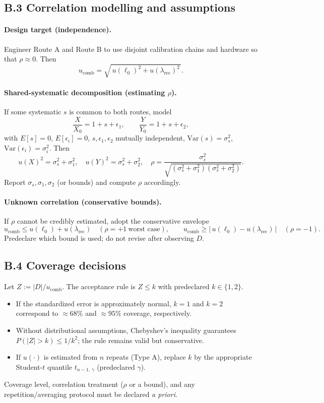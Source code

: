 \documentclass[11pt]{article}
\begin{document}
\subsection*{B.3 Correlation modelling and assumptions}
\paragraph{Design target (independence).}
Engineer Route A and Route B to use disjoint calibration chains and hardware so that \(\rho\approx 0\). Then
\[
u_{\mathrm{comb}}=\sqrt{\,u(\ell_0)^2 + u(\lambda_{\mathrm{rec}})^2\,}.
\]

\paragraph{Shared-systematic decomposition (estimating \(\rho\)).}
If some systematic \(s\) is common to both routes, model
\[
\frac{X}{X_0}=1+s+\epsilon_1,\qquad
\frac{Y}{Y_0}=1+s+\epsilon_2,
\]
with \(E[s]=0\), \(E[\epsilon_i]=0\), \(s,\epsilon_1,\epsilon_2\) mutually independent, \(\mathrm{Var}(s)=\sigma_s^2\), \(\mathrm{Var}(\epsilon_i)=\sigma_i^2\).
Then
\[
u(X)^2=\sigma_s^2+\sigma_1^2,\quad
u(Y)^2=\sigma_s^2+\sigma_2^2,\quad
\rho=\frac{\sigma_s^2}{\sqrt{(\sigma_s^2+\sigma_1^2)(\sigma_s^2+\sigma_2^2)}}.
\]
Report \(\sigma_s,\sigma_1,\sigma_2\) (or bounds) and compute \(\rho\) accordingly.

\paragraph{Unknown correlation (conservative bounds).}
If \(\rho\) cannot be credibly estimated, adopt the conservative envelope
\[
u_{\mathrm{comb}} \le u(\ell_0)+u(\lambda_{\mathrm{rec}})\quad(\rho=+1\ \text{worst case}),\qquad
u_{\mathrm{comb}} \ge \big|\,u(\ell_0)-u(\lambda_{\mathrm{rec}})\,\big|\quad(\rho=-1).
\]
Predeclare which bound is used; do not revise after observing \(D\).

\subsection*{B.4 Coverage decisions}
Let \(Z:=|D|/u_{\mathrm{comb}}\). The acceptance rule is \(Z\le k\) with predeclared \(k\in\{1,2\}\).
\begin{itemize}
  \item If the standardized error is approximately normal, \(k=1\) and \(k=2\) correspond to \(\approx68\%\) and \(\approx95\%\) coverage, respectively.
  \item Without distributional assumptions, Chebyshev’s inequality guarantees \(P(|Z|>k)\le 1/k^2\); the rule remains valid but conservative.
  \item If \(u(\cdot)\) is estimated from \(n\) repeats (Type A), replace \(k\) by the appropriate Student-\(t\) quantile \(t_{n-1,\,\gamma}\) (predeclared \(\gamma\)).
\end{itemize}
Coverage level, correlation treatment (\(\rho\) or a bound), and any repetition/averaging protocol must be declared \emph{a priori}.
\end{document}
